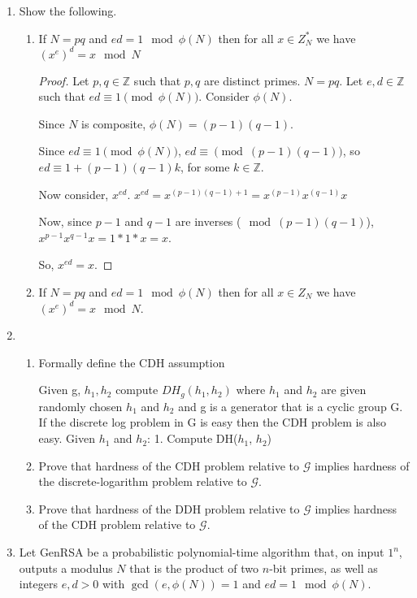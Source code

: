 \documentclass{article}
\begin{document}
\begin{enumerate}
\begin{proof}
      So, for some value of $a, b \in \mathbb{Z}$, if $x = bN + a, \left[\left[X
      \mod p\right] \mod N\right] \neq \left[X \mod N\right]$.

      Therefore, we can see that no such $X$ exists.
    \end{proof}

  \item Show the following.
    \begin{enumerate}
      \item If $N = pq$ and $ed = 1 \mod \phi(N)$ then for all $x \in Z^{*}_N$ 
        we have $(x^e)^d = x \mod N$

        \begin{proof}
          Let $p, q \in \mathbb{Z}$ such that $p, q$ are distinct primes. $N =
          pq$. Let $e, d \in \mathbb{Z}$ such that $ed \equiv 1 \pmod{\phi(N)}$.
          Consider $\phi(N)$.

          Since $N$ is composite, $\phi(N) = (p - 1)(q - 1)$.

          Since $ed \equiv 1 \pmod{\phi(N)}$, $ed \equiv \pmod{(p - 1)(q - 1)}$,
          so $ed \equiv 1 + (p - 1)(q - 1)k$, for some $k \in \mathbb{Z}$.

          Now consider, $x^{ed}$. $x^{ed} = x^{(p - 1)(q - 1) + 1} = x^{(p -
            1)}x^{(q - 1)}x$

          Now, since $p - 1$ and $q - 1$ are inverses ($\mod (p - 1)(q - 1)$),
          $x^{p - 1}x^{q - 1}x = 1 * 1 * x = x$.

          So, $x^{ed} = x$.
         \end{proof}

      \item If $N = pq$ and $ed = 1 \mod \phi(N)$ then for all $x \in Z_N$ we
        have $(x^e)^d = x \mod N$.
    \end{enumerate}
  \item 
    \begin{enumerate}
      \item Formally define the CDH assumption

      Given g, $h_1, h_2$ compute $DH_g(h_1, h_2)$ where $h_1$ and $h_2$ are given randomly chosen $h_1$ and $h_2$ and g is a generator that is a cyclic group G. 
      If the discrete log problem in G is easy then the CDH problem is also easy. 
      Given $h_1$ and $h_2$:
      1. Compute DH($h_1$, $h_2$)
      
      \item Prove that hardness of the CDH problem relative to $\mathcal{G}$ implies
        hardness of the discrete-logarithm problem relative to $\mathcal{G}$.
      \item Prove that hardness of the DDH problem relative to $\mathcal{G}$
        implies hardness of the CDH problem relative to $\mathcal{G}$.
    \end{enumerate}
  \item Let \textsf{GenRSA} be a probabilistic polynomial-time algorithm that,
    on input $1^n$, outputs a modulus $N$ that is the product of two $n$-bit 
    primes, as well as integers $e, d > 0$ with $\gcd(e, \phi(N)) = 1$ and 
    $ed = 1 \mod \phi(N)$.


\end{enumerate}
\end{document}
